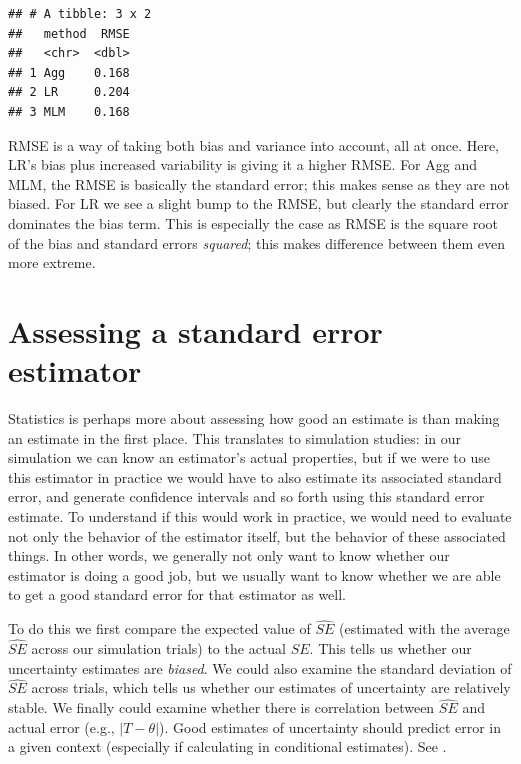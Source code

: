 \documentclass[
]{book}
\begin{document}
\begin{verbatim}
## # A tibble: 3 x 2
##   method  RMSE
##   <chr>  <dbl>
## 1 Agg    0.168
## 2 LR     0.204
## 3 MLM    0.168
\end{verbatim}

RMSE is a way of taking both bias and variance into account, all at once.
Here, LR's bias plus increased variability is giving it a higher RMSE.
For Agg and MLM, the RMSE is basically the standard error; this makes sense as they are not biased.
For LR we see a slight bump to the RMSE, but clearly the standard error dominates the bias term.
This is especially the case as RMSE is the square root of the bias and standard errors \emph{squared}; this makes difference between them even more extreme.

\hypertarget{assessing-a-standard-error-estimator}{%
\section{Assessing a standard error estimator}\label{assessing-a-standard-error-estimator}}

Statistics is perhaps more about assessing how good an estimate is than making an estimate in the first place.
This translates to simulation studies: in our simulation we can know an estimator's actual properties, but if we were to use this estimator in practice we would have to also estimate its associated standard error, and generate confidence intervals and so forth using this standard error estimate.
To understand if this would work in practice, we would need to evaluate not only the behavior of the estimator itself, but the behavior of these associated things.
In other words, we generally not only want to know whether our estimator is doing a good job, but we usually want to know whether we are able to get a good standard error for that estimator as well.

To do this we first compare the expected value of \(\widehat{SE}\) (estimated with the average \(\widehat{SE}\) across our simulation trials) to the actual \(SE\).
This tells us whether our uncertainty estimates are \emph{biased}.
We could also examine the standard deviation of \(\widehat{SE}\) across trials, which tells us whether our estimates of uncertainty are relatively stable.
We finally could examine whether there is correlation between \(\widehat{SE}\) and actual error (e.g., \(\left|T - \theta \right|\)).
Good estimates of uncertainty should predict error in a given context (especially if calculating in conditional estimates).
See \citet{sundberg2003conditional}.
\end{document}

